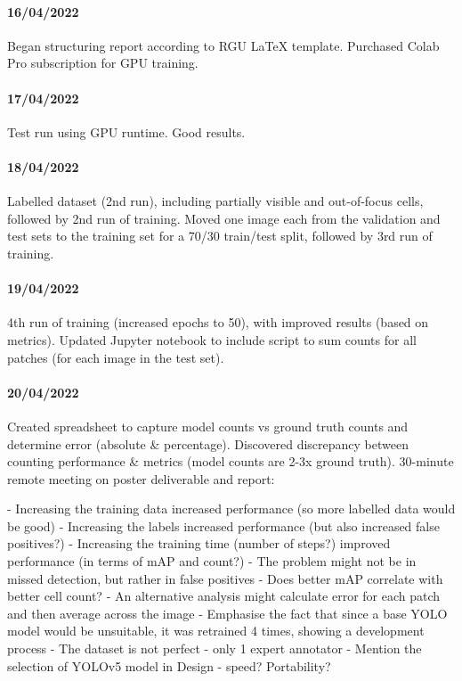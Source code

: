 \begin{appendices}
\paragraph{16/04/2022}
Began structuring report according to RGU LaTeX template. Purchased Colab Pro subscription for GPU training.

\paragraph{17/04/2022}
Test run using GPU runtime. Good results.

\paragraph{18/04/2022}
Labelled dataset (2nd run), including partially visible and out-of-focus cells, followed by 2nd run of training. Moved one image each from the validation and test sets to the training set for a 70/30 train/test split, followed by 3rd run of training.

\paragraph{19/04/2022}
4th run of training (increased epochs to 50), with improved results (based on metrics). Updated Jupyter notebook to include script to sum counts for all patches (for each image in the test set).

\paragraph{20/04/2022}
Created spreadsheet to capture model counts vs ground truth counts and determine error (absolute & percentage). Discovered discrepancy between counting performance & metrics (model counts are 2-3x ground truth). 30-minute remote meeting on poster deliverable and report:

- Increasing the training data increased performance (so more labelled data would be good)
- Increasing the labels increased performance (but also increased false positives?)
- Increasing the training time (number of steps?) improved performance (in terms of mAP and count?)
- The problem might not be in missed detection, but rather in false positives
- Does better mAP correlate with better cell count?
- An alternative analysis might calculate error for each patch and then average across the image
- Emphasise the fact that since a base YOLO model would be unsuitable, it was retrained 4 times, showing a development process
- The dataset is not perfect - only 1 expert annotator
- Mention the selection of YOLOv5 model in Design - speed? Portability?


\end{appendices}
